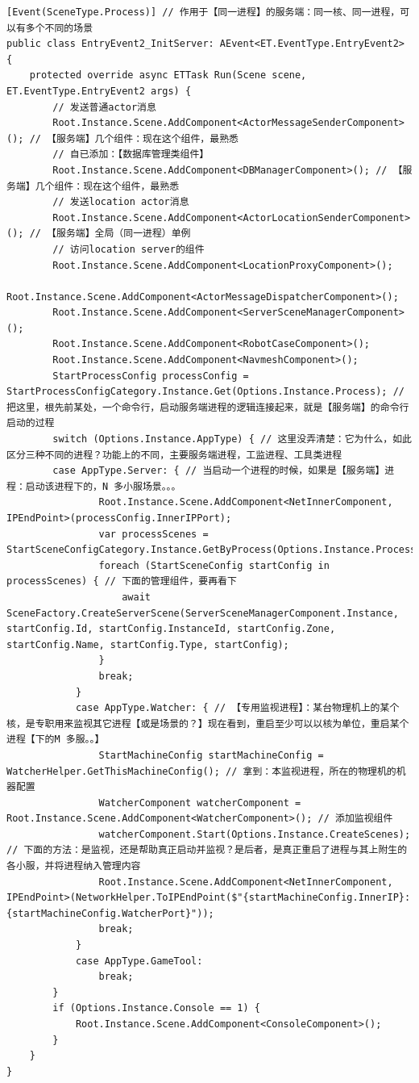 \documentclass[9pt, b5paper]{article}
\begin{document}
\begin{verbatim}
[Event(SceneType.Process)] // 作用于【同一进程】的服务端：同一核、同一进程，可以有多个不同的场景
public class EntryEvent2_InitServer: AEvent<ET.EventType.EntryEvent2> {
    protected override async ETTask Run(Scene scene, ET.EventType.EntryEvent2 args) {
        // 发送普通actor消息
        Root.Instance.Scene.AddComponent<ActorMessageSenderComponent>(); // 【服务端】几个组件：现在这个组件，最熟悉
        // 自已添加：【数据库管理类组件】
        Root.Instance.Scene.AddComponent<DBManagerComponent>(); // 【服务端】几个组件：现在这个组件，最熟悉
        // 发送location actor消息
        Root.Instance.Scene.AddComponent<ActorLocationSenderComponent>(); // 【服务端】全局（同一进程）单例
        // 访问location server的组件
        Root.Instance.Scene.AddComponent<LocationProxyComponent>();
        Root.Instance.Scene.AddComponent<ActorMessageDispatcherComponent>();
        Root.Instance.Scene.AddComponent<ServerSceneManagerComponent>();
        Root.Instance.Scene.AddComponent<RobotCaseComponent>();
        Root.Instance.Scene.AddComponent<NavmeshComponent>();
        StartProcessConfig processConfig = StartProcessConfigCategory.Instance.Get(Options.Instance.Process); // 把这里，根先前某处，一个命令行，启动服务端进程的逻辑连接起来，就是【服务端】的命令行启动的过程
        switch (Options.Instance.AppType) { // 这里没弄清楚：它为什么，如此区分三种不同的进程？功能上的不同，主要服务端进程，工监进程、工具类进程
        case AppType.Server: { // 当启动一个进程的时候，如果是【服务端】进程：启动该进程下的，N 多小服场景。。。
                Root.Instance.Scene.AddComponent<NetInnerComponent, IPEndPoint>(processConfig.InnerIPPort);
                var processScenes = StartSceneConfigCategory.Instance.GetByProcess(Options.Instance.Process);
                foreach (StartSceneConfig startConfig in processScenes) { // 下面的管理组件，要再看下
                    await SceneFactory.CreateServerScene(ServerSceneManagerComponent.Instance, startConfig.Id, startConfig.InstanceId, startConfig.Zone, startConfig.Name, startConfig.Type, startConfig);
                }
                break;
            }
            case AppType.Watcher: { // 【专用监视进程】：某台物理机上的某个核，是专职用来监视其它进程【或是场景的？】现在看到，重启至少可以以核为单位，重启某个进程【下的M 多服。。】
                StartMachineConfig startMachineConfig = WatcherHelper.GetThisMachineConfig(); // 拿到：本监视进程，所在的物理机的机器配置
                WatcherComponent watcherComponent = Root.Instance.Scene.AddComponent<WatcherComponent>(); // 添加监视组件
                watcherComponent.Start(Options.Instance.CreateScenes); // 下面的方法：是监视，还是帮助真正启动并监视？是后者，是真正重启了进程与其上附生的各小服，并将进程纳入管理内容
                Root.Instance.Scene.AddComponent<NetInnerComponent, IPEndPoint>(NetworkHelper.ToIPEndPoint($"{startMachineConfig.InnerIP}:{startMachineConfig.WatcherPort}"));
                break;
            }
            case AppType.GameTool:
                break;
        }
        if (Options.Instance.Console == 1) {
            Root.Instance.Scene.AddComponent<ConsoleComponent>();
        }
    }
}
\end{verbatim}
\end{document}
